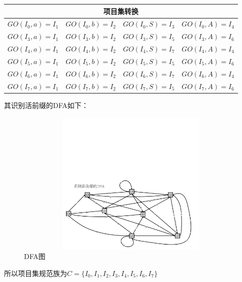 \documentclass{article}
\begin{document}
\begin{center}
    \begin{longtable}{|c|c|c|c|}\hline
        \multicolumn{4}{|c|}{项目集转换}                                      \\\hline
        $GO(I_0,a)=I_1$ & $GO(I_0,b)=I_2$ & $GO(I_0,S)=I_3$ & $GO(I_0,A)=I_4$ \\\hline
        $GO(I_3,a)=I_1$ & $GO(I_3,b)=I_2$ & $GO(I_3,S)=I_5$ & $GO(I_3,A)=I_6$ \\\hline
        $GO(I_4,a)=I_1$ & $GO(I_4,b)=I_2$ & $GO(I_4,S)=I_7$ & $GO(I_4,A)=I_4$ \\\hline
        $GO(I_5,a)=I_1$ & $GO(I_5,b)=I_2$ & $GO(I_5,S)=I_5$ & $GO(I_5,A)=I_6$ \\\hline
        $GO(I_6,a)=I_1$ & $GO(I_6,b)=I_2$ & $GO(I_6,S)=I_7$ & $GO(I_6,A)=I_4$ \\\hline
        $GO(I_7,a)=I_1$ & $GO(I_7,b)=I_2$ & $GO(I_7,S)=I_5$ & $GO(I_7,A)=I_6$ \\\hline
    \end{longtable}
\end{center}
\vspace{-1cm}
其识别活前缀的DFA如下：\\
\begin{figure}[ht]
    \centering
    \includegraphics[width=15cm,height=7cm]{DFA.pdf}
    \caption{DFA图}
\end{figure}
\newpage
所以项目集规范族为$C=\{I_0,I_1,I_2,I_3,I_4,I_5,I_6,I_7\}$
\end{document}
